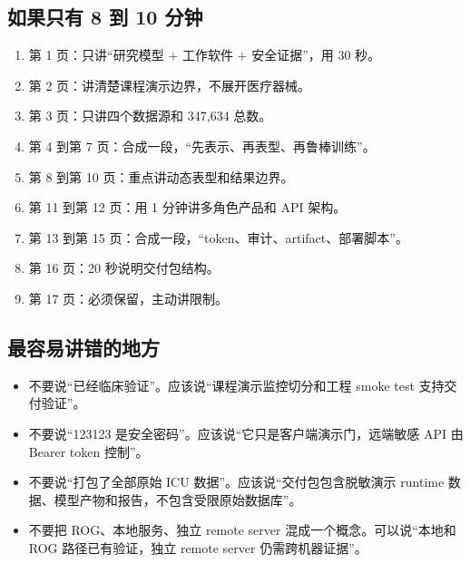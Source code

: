 \documentclass[11pt,a4paper]{article}
\begin{document}
\subsection*{如果只有 8 到 10 分钟}
\begin{enumerate}
  \item 第 1 页：只讲“研究模型 + 工作软件 + 安全证据”，用 30 秒。
  \item 第 2 页：讲清楚课程演示边界，不展开医疗器械。
  \item 第 3 页：只讲四个数据源和 347,634 总数。
  \item 第 4 到第 7 页：合成一段，“先表示、再表型、再鲁棒训练”。
  \item 第 8 到第 10 页：重点讲动态表型和结果边界。
  \item 第 11 到第 12 页：用 1 分钟讲多角色产品和 API 架构。
  \item 第 13 到第 15 页：合成一段，“token、审计、artifact、部署脚本”。
  \item 第 16 页：20 秒说明交付包结构。
  \item 第 17 页：必须保留，主动讲限制。
\end{enumerate}

\subsection*{最容易讲错的地方}
\begin{itemize}
  \item 不要说“已经临床验证”。应该说“课程演示监控切分和工程 smoke test 支持交付验证”。
  \item 不要说“123123 是安全密码”。应该说“它只是客户端演示门，远端敏感 API 由 Bearer token 控制”。
  \item 不要说“打包了全部原始 ICU 数据”。应该说“交付包包含脱敏演示 runtime 数据、模型产物和报告，不包含受限原始数据库”。
  \item 不要把 ROG、本地服务、独立 remote server 混成一个概念。可以说“本地和 ROG 路径已有验证，独立 remote server 仍需跨机器证据”。
\end{itemize}
\end{document}
